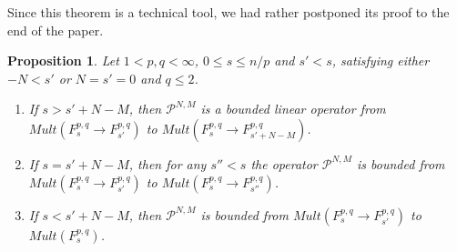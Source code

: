 \documentclass[12pt,twoside,leqno,final]{amsart}
\theoremstyle{plain}
\newtheorem{prop}[thm]{Proposition}
\begin{document}
Since this theorem is a technical tool, we had rather postponed its proof to the end of the paper. 

\begin{prop}\label{prop:PNMmaps}
Let $1< p,q<\infty$, $0\le s\le n/p$  
and $s'<  s$, satisfying either 
$-N<s'$ or $N=s'=0$ and $q\le 2$.

\begin{enumerate}
	\item \label{item:PNMmaps1}  If $s>s'+N-M$, then ${{\mathcal P}}^{N,M}$ is a bounded linear operator  from 
$Mult(F^{p,q}_s\to F^{p,q}_{s'})$ to $Mult(F^{p,q}_s\to F^{p,q}_{s'+N-M})$.
 
	\item \label{item:PNMmaps2} If $s=s'+N-M$, then for any $s''<s$ the operator   
${{\mathcal P}}^{N,M}$ is bounded from $Mult(F^{p,q}_s\to F^{p,q}_{s'})$ to $Mult(F^{p,q}_s\to F^{p,q}_{s''})$.

\item \label{item:PNMmaps3} If $s<s'+N-M$, then  ${{\mathcal P}}^{N,M}$ is bounded from 
$Mult(F^{p,q}_s\to F^{p,q}_{s'})$ to  $Mult(F^{p,q}_s)$.
\end{enumerate}
\end{prop}
\end{document}
